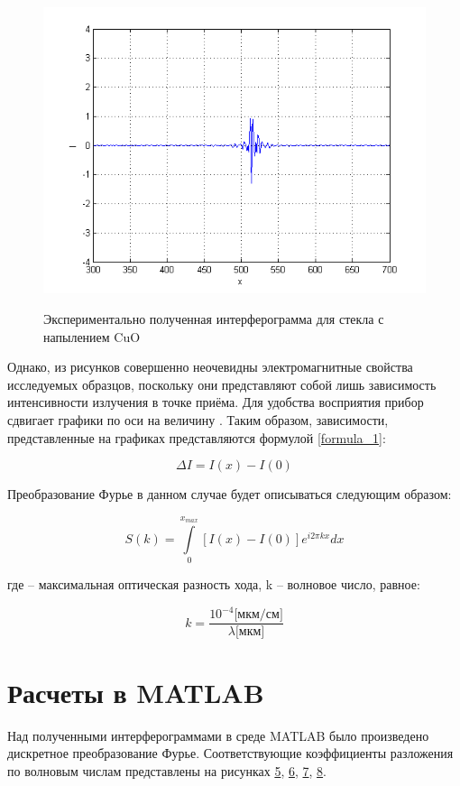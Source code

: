 \documentclass[a4paper,12pt]{article} %
\begin{document}

    \begin{figure}[h!]
        \centering
        \includegraphics[width=0.48\linewidth]{4.png}
        \label{picture_4}
        \caption{Экспериментально полученная интерферограмма для стекла с напылением CuO}
    \end{figure}

    Однако, из рисунков совершенно неочевидны электромагнитные свойства исследуемых образцов, 
    поскольку они представляют собой лишь зависимость интенсивности излучения в точке приёма. 
    Для удобства восприятия прибор сдвигает графики по оси  на величину . 
    Таким образом, зависимости, представленные на графиках представляются формулой \eqref{formula_1}:

    \begin{equation} \label{formula_1}
        \Delta I = I(x) - I(0)
    \end{equation}

    Преобразование Фурье в данном случае будет описываться следующим образом:

    \begin{equation}
        S(k) = \int\limits^{x_{max}}_{0} [I(x) - I(0)] e^{i 2 \pi kx} dx
    \end{equation}

    где – максимальная оптическая разность хода, k – волновое число, равное:

    \begin{equation}
        k = \frac{10^{-4} \text{[мкм/см]}}{\lambda \text{[мкм]}}
    \end{equation}

    \section{Расчеты в MATLAB}

    Над полученными интерферограммами в среде MATLAB было произведено дискретное преобразование Фурье. 
    Соответствующие коэффициенты разложения по волновым числам представлены на рисунках 
    \hyperref[picture_5]{5}, \hyperref[picture_6]{6}, \hyperref[picture_7]{7}, \hyperref[picture_8]{8}.
\end{document}
